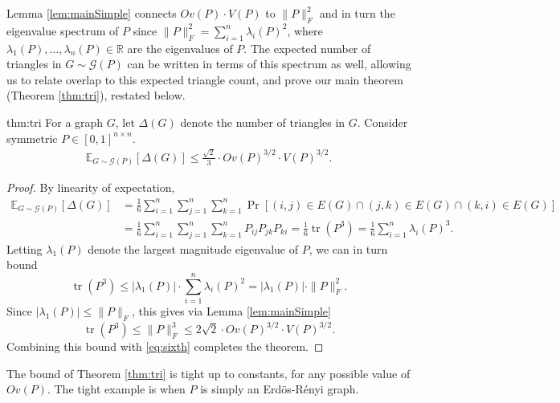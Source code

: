 \documentclass{article}
\newcommand{\Cam}[1]{\textcolor{blue}{Cam: #1}}
\newcommand{\R}{\mathbb{R}}
\newcommand{\norm}[1]{\|#1\|}
\newcommand{\E}{\mathbb{E}}
\DeclareMathOperator{\tr}{tr}
\begin{document}
Lemma \ref{lem:mainSimple} connects $Ov(P) \cdot V(P)$ to $\norm{P}_F^2$ and in turn the eigenvalue spectrum of $P$ since $\norm{P}_F^2 = \sum_{i=1}^n \lambda_i(P)^2$, where $\lambda_1(P),\ldots, \lambda_n(P) \in \R$ are the eigenvalues of $P$. The expected number of triangles in $G \sim \mathcal{G}(P)$ can be written in terms of this spectrum as well, allowing us to relate overlap to this expected triangle count, and prove our main theorem (Theorem \ref{thm:tri}), restated below.

\begin{reptheorem}{thm:tri} For a graph $G$, let $\Delta(G)$ denote the number of triangles in $G$. Consider symmetric $P \in [0,1]^{n \times n}$. 
\begin{align*}
\E_{G \sim \mathcal{G}(P)} \left [\Delta(G) \right ]\le \frac{\sqrt{2}}{3} \cdot Ov(P)^{3/2} \cdot V(P)^{3/2}.
\end{align*}
\end{reptheorem}
\begin{proof}
By linearity of expectation,
\begin{align}
\E_{G \sim \mathcal{G}(P)} \left [\Delta(G) \right ] &= \frac{1}{6} \sum_{i=1}^n \sum_{j=1}^n \sum_{k=1}^n \Pr \left [(i,j) \in E(G) \cap (j,k) \in E(G) \cap (k,i) \in E(G) \right]\nonumber \\
&= \frac{1}{6} \sum_{i=1}^n \sum_{j=1}^n \sum_{k=1}^n P_{ij} P_{jk} P_{ki} = \frac{1}{6} \tr(P^3) = \frac{1}{6} \sum_{i=1}^n \lambda_i(P)^3.\label{eq:sixth}
\end{align}
Letting $\lambda_1(P)$ denote the largest magnitude eigenvalue of $P$, we can in turn bound
$$\tr(P^3) \le |\lambda_1(P)| \cdot \sum_{i=1}^n \lambda_i(P)^2 = |\lambda_1(P)| \cdot \norm{P}_F^2.$$ Since $|\lambda_1(P)| \le \norm{P}_F$, this gives via Lemma \ref{lem:mainSimple}
$$\tr(P^3) \le \norm{P}_F^3 \le 2 \sqrt{2} \cdot Ov(P)^{3/2} \cdot V(P)^{3/2}.$$
Combining this bound with \eqref{eq:sixth} completes the theorem.
\end{proof}

The bound of Theorem \ref{thm:tri} is tight up to constants, for any possible value of $Ov(P)$. The tight example is when $P$ is simply an Erd\"{o}s-R\'{e}nyi graph.
\end{document}

